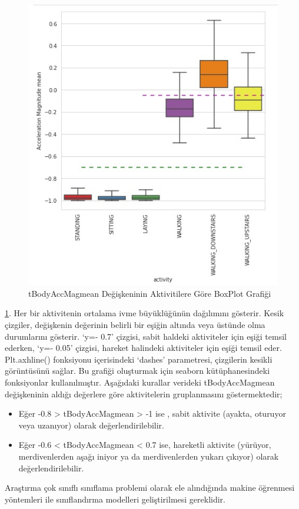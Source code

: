 \documentclass[12pt,twoside]{deuthesis}
\providecommand{\tightlist}{%
  \setlength{\itemsep}{0pt}\setlength{\parskip}{0pt}}
\begin{document}
\begin{figure}
\includegraphics[width=1\linewidth,height=0.45\textheight]{figure/boxplot} \caption{tBodyAccMagmean Değişkeninin Aktivitilere Göre BoxPlot Grafiği}\label{fig:boxplot}
\end{figure}
\ref{fig:boxplot}. Her bir aktivitenin ortalama ivme büyüklüğünün dağılımını gösterir. Kesik çizgiler, değişkenin değerinin belirli bir eşiğin altında veya üstünde olma durumlarını gösterir. `y=- 0.7' çizgisi, sabit haldeki aktiviteler için eşiği temsil ederken, `y=- 0.05' çizgisi, hareket halindeki aktiviteler için eşiği temsil eder. Plt.axhline() fonksiyonu içerisindeki `dashes' parametresi, çizgilerin kesikli görüntüsünü sağlar. Bu grafiği oluşturmak için seaborn kütüphanesindeki fonksiyonlar kullanılmıştır. Aşağıdaki kurallar verideki tBodyAccMagmean değişkeninin aldığı değerlere göre aktivitelerin gruplanmasını göstermektedir;
\begin{itemize}
\tightlist
\item
  Eğer -0.8 \textgreater{} tBodyAccMagmean \textgreater{} -1 ise , sabit aktivite (ayakta, oturuyor veya uzanıyor) olarak değerlendirilebilir.
\item
  Eğer -0.6 \textless{} tBodyAccMagmean \textless{} 0.7 ise, hareketli aktivite (yürüyor, merdivenlerden aşağı iniyor ya da merdivenlerden yukarı çıkıyor) olarak değerlendirilebilir.
\end{itemize}
Araştırma çok sınıflı sınıflama problemi olarak ele alındığında makine öğrenmesi yöntemleri ile sınıflandırma modelleri geliştirilmesi gereklidir.
\end{document}
